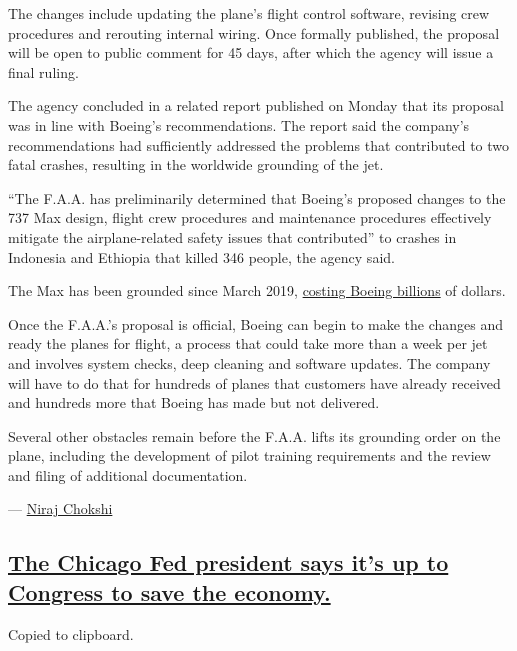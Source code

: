 The changes include updating the plane's flight control software,
revising crew procedures and rerouting internal wiring. Once formally
published, the proposal will be open to public comment for 45 days,
after which the agency will issue a final ruling.

The agency concluded in a related report published on Monday that its
proposal was in line with Boeing's recommendations. The report said the
company's recommendations had sufficiently addressed the problems that
contributed to two fatal crashes, resulting in the worldwide grounding
of the jet.

``The F.A.A. has preliminarily determined that Boeing's proposed changes
to the 737 Max design, flight crew procedures and maintenance procedures
effectively mitigate the airplane-related safety issues that
contributed'' to crashes in Indonesia and Ethiopia that killed 346
people, the agency said.

The Max has been grounded since March 2019,
\href{https://www.nytimes3xbfgragh.onion/2020/01/29/business/boeing-737-max-costs.html}{costing
Boeing billions} of dollars.

Once the F.A.A.'s proposal is official, Boeing can begin to make the
changes and ready the planes for flight, a process that could take more
than a week per jet and involves system checks, deep cleaning and
software updates. The company will have to do that for hundreds of
planes that customers have already received and hundreds more that
Boeing has made but not delivered.

Several other obstacles remain before the F.A.A. lifts its grounding
order on the plane, including the development of pilot training
requirements and the review and filing of additional documentation.

--- \href{https://www.nytimes3xbfgragh.onion/by/niraj-chokshi}{Niraj
Chokshi}

\hypertarget{the-chicago-fed-president-says-its-up-to-congress-to-save-the-economy}{%
\subsection{\texorpdfstring{\protect\hyperlink{the-chicago-fed-president-says-its-up-to-congress-to-save-the-economy}{The
Chicago Fed president says it's up to Congress to save the
economy.}}{The Chicago Fed president says it's up to Congress to save the economy.}}\label{the-chicago-fed-president-says-its-up-to-congress-to-save-the-economy}}

Copied to clipboard.


